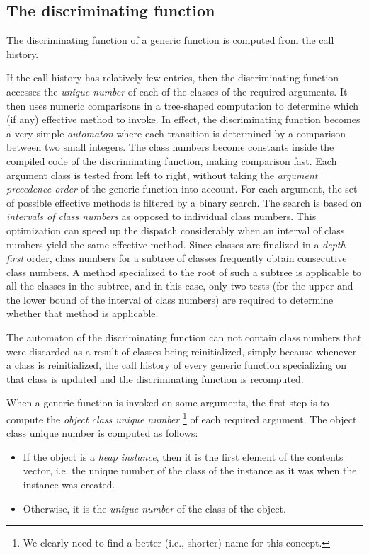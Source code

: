\subsection{The discriminating function}
\label{sec-generic-function-dispatch-the-discriminating-function}

The discriminating function of a generic function is computed from the
call history.

If the call history has relatively few entries, then the
discriminating function accesses the \emph{unique number} of each of
the classes of the required arguments.  It then uses numeric
comparisons in a tree-shaped computation to determine which (if any)
effective method to invoke.  In effect, the discriminating function
becomes a very simple \emph{automaton} where each transition is
determined by a comparison between two small integers.  The class
numbers become constants inside the compiled code of the
discriminating function, making comparison fast.  Each argument class
is tested from left to right, without taking the \emph{argument
  precedence order} of the generic function into account.  For each
argument, the set of possible effective methods is filtered by a
binary search.  The search is based on \emph{intervals of class
  numbers} as opposed to individual class numbers.  This optimization
can speed up the dispatch considerably when an interval of class
numbers yield the same effective method.  Since classes are finalized
in a \emph{depth-first} order, class numbers for a subtree of classes
frequently obtain consecutive class numbers.  A method specialized to
the root of such a subtree is applicable to all the classes in the
subtree, and in this case, only two tests (for the upper and the lower
bound of the interval of class numbers) are required to determine
whether that method is applicable. 

The automaton of the discriminating function can not contain class
numbers that were discarded as a result of classes being
reinitialized, simply because whenever a class is reinitialized, the
call history of every generic function specializing on that class is
updated and the discriminating function is recomputed.  

When a generic function is invoked on some arguments, the first step
is to compute the \emph{object class unique number}%
\footnote{We clearly need to find a better (i.e., shorter) name for
  this concept.} of each required argument.  The object class unique
number is computed as follows:

\begin{itemize}
\item If the object is a \emph{heap instance}, then it is the first
  element of the contents vector, i.e. the unique number of the class
  of the instance as it was when the instance was created.
\item Otherwise, it is the \emph{unique number} of the class of the
  object.
\end{itemize}

